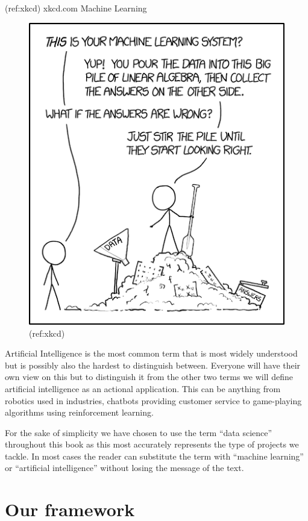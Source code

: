 \documentclass[]{book}
\begin{document}
(ref:xkcd) xkcd.com Machine Learning

\begin{center}

\begin{figure}
\includegraphics[width=0.5\linewidth]{figures/xkcd} \caption{(ref:xkcd)}\label{fig:xkcd-fig}
\end{figure}

\end{center}

Artificial Intelligence is the most common term that is most widely
understood but is possibly also the hardest to distinguish between.
Everyone will have their own view on this but to distinguish it from the
other two terms we will define artificial intelligence as an actional
application. This can be anything from robotics used in industries,
chatbots providing customer service to game-playing algorithms using
reinforcement learning.

For the sake of simplicity we have chosen to use the term ``data
science'' throughout this book as this most accurately represents the
type of projects we tackle. In most cases the reader can substitute the
term with ``machine learning'' or ``artificial intelligence'' without
losing the message of the text.

\hypertarget{our-framework}{%
\section{Our framework}\label{our-framework}}
\end{document}

